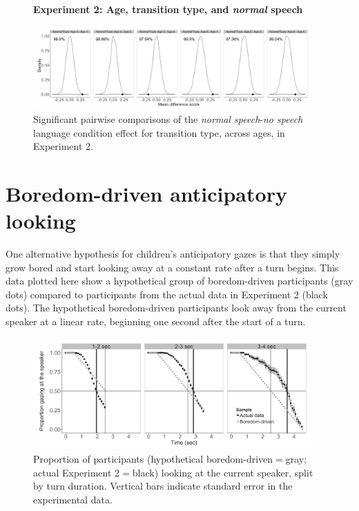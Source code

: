 \documentclass[authoryear, 12pt]{elsarticle}
\begin{document}
\begin{figure}
\begin{center}
\textbf{Experiment 2: Age, transition type, and \textit{normal} speech}\par\medskip
\includegraphics[width=0.95\textwidth]{figures/E2-child-randvsreal-ttest-normaltypesages.png}
\end{center}
\caption{Significant pairwise comparisons of the \textit{normal speech}-\textit{no speech} language condition effect for transition type, across ages, in Experiment 2.} 
\label{fig:E2-lgagetypeinteraction}
\end{figure}

\section{Boredom-driven anticipatory looking}
\label{sec:boredlooks}
\setcounter{figure}{0}  

One alternative hypothesis for children's anticipatory gazes is that they simply grow bored and start looking away at a constant rate after a turn begins. This data plotted here show a hypothetical group of boredom-driven participants (gray dots) compared to participants from the actual data in Experiment 2 (black dots). The hypothetical boredom-driven participants look away from the current speaker at a linear rate, beginning one second after the start of a turn. 

\begin{figure}[!htb]
\begin{center}
\includegraphics[width=0.95\textwidth]{figures/boredom-hypothesis.png}
\end{center}
\caption{Proportion of participants (hypothetical boredom-driven$=$gray; actual Experiment 2$=$black) looking at the current speaker, split by turn duration. Vertical bars indicate standard error in the experimental data.} 
\label{fig:boredomhypothesis}
\end{figure}
\end{document}
